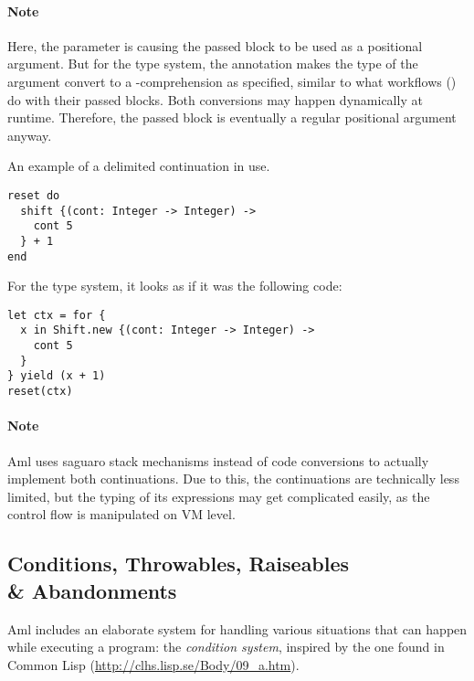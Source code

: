 \paragraph{Note}
Here, the  parameter is causing the passed block to be used as a positional argument. But for the type system, the annotation  makes the type of the argument convert to a -comprehension as specified, similar to what workflows () do with their passed blocks. Both conversions may happen dynamically at runtime. Therefore, the passed block is eventually a regular positional argument anyway. 

\example An example of a delimited continuation in use. 
\begin{lstlisting}
reset do
  shift {(cont: Integer -> Integer) ->
    cont 5
  } + 1
end
\end{lstlisting}
For the type system, it looks as if it was the following code:
\begin{lstlisting}
let ctx = for {
  x in Shift.new {(cont: Integer -> Integer) ->
    cont 5
  }
} yield (x + 1)
reset(ctx)
\end{lstlisting}

\paragraph{Note}
Aml uses saguaro stack mechanisms instead of code conversions to actually implement both continuations. Due to this, the continuations are technically less limited, but the typing of its expressions may get complicated easily, as the control flow is manipulated on VM level.






\subsection[Conditions, Throwables, Raiseables \& Abandonments]{Conditions, Throwables, Raiseables\\\& Abandonments}

Aml includes an elaborate system for handling various situations that can happen while executing a program: the {\em condition system}, inspired by the one found in Common Lisp (\url{http://clhs.lisp.se/Body/09_a.htm}). 

